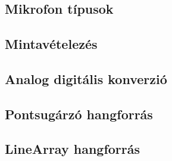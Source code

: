 \chapter{\AudioBasics}


\section{Mikrofon típusok}

\section{Mintavételezés}

\section{Analog digitális konverzió}

\section{Pontsugárzó hangforrás}

\section{LineArray hangforrás}
